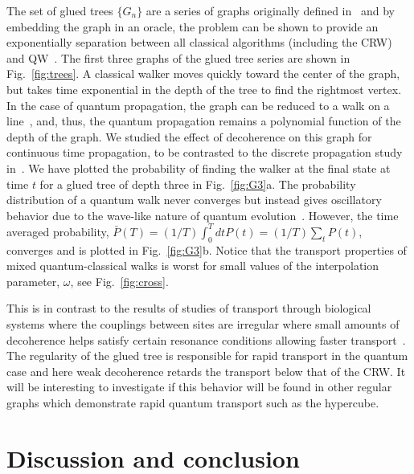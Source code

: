 \documentclass[11pt,oneside,final]{huthesis}%
\begin{document}
The set of glued trees $\{G_n\}$ are a series of graphs originally defined in~\cite{Childs02} and by embedding the graph in an oracle, the problem can be shown to provide an exponentially separation between all classical algorithms (including the CRW) and QW~\cite{Childs03}.  The first three graphs of the glued tree series are shown in Fig.~\ref{fig:trees}.  A classical walker moves quickly toward the center of the graph, but takes time exponential in the depth of the tree to find the rightmost vertex.  In the case of quantum propagation, the graph can be reduced to a walk on a line~\cite{Childs02,Kempe03walk}, and, thus, the quantum propagation remains a polynomial function of the depth of the graph. We studied the effect of decoherence on this graph for continuous time propagation, to be contrasted to the discrete propagation study in~\cite{Kendon03}.  We have plotted the probability of finding the walker at the final state at time $t$ for a glued tree of depth three in Fig.~\ref{fig:G3}a.  The probability distribution of a quantum walk never converges but instead gives oscillatory behavior due to the wave-like nature of quantum evolution~\cite{Aharonov01}. However, the time averaged probability, $\bar{P}(T)=(1/T)\int_0^T dt P(t)=(1/T)\sum_t P(t)$, converges and is plotted in Fig.~\ref{fig:G3}b.  Notice that the transport properties of mixed quantum-classical walks is worst for small values of the interpolation parameter, $\omega$, see Fig.~\ref{fig:cross}.

This is in contrast to the results of studies of transport through biological systems where the couplings between sites are irregular where small amounts of decoherence helps satisfy certain resonance conditions allowing faster transport~\cite{Rebentrost08,Mohseni08, Plenio08,Caruso09,Rebentrost09}.  The regularity of the glued tree is responsible for rapid transport in the quantum case \cite{Childs02} and here weak decoherence retards the transport below that of the CRW. It will be interesting to investigate if this behavior will be found in other regular graphs which demonstrate rapid quantum transport such as the hypercube.    %


\section{Discussion and conclusion}
\end{document}
